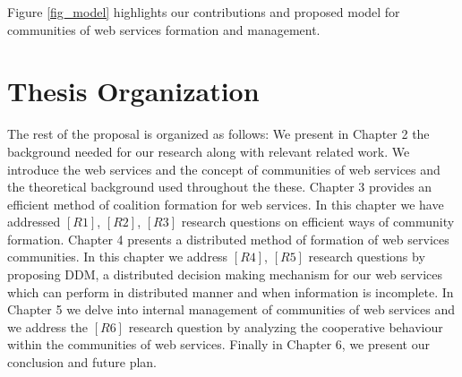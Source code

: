 %
%

Figure \ref{fig_model} highlights our contributions and proposed model for communities of web services formation and management.

\section{Thesis Organization}\label{sec:outline}
The rest of the proposal is organized as follows: We present in Chapter 2 the background needed for our research along with relevant related work. We introduce the web services and the concept of communities of web services and the theoretical background used throughout the these. Chapter 3 provides an efficient method of coalition formation for web services. In this chapter we have addressed $[R1]$, $[R2]$, $[R3]$ research questions on efficient ways of community formation.  Chapter 4 presents a distributed method of formation of web services communities. In this chapter we address $[R4]$, $[R5]$ research questions by proposing DDM, a distributed decision making mechanism for our web services which can perform in distributed manner and when information is incomplete. In Chapter 5 we delve into internal management of communities of web services and we address the $[R6]$ research question by analyzing the cooperative behaviour within the communities of web services. Finally in Chapter 6, we present our conclusion and future plan.



